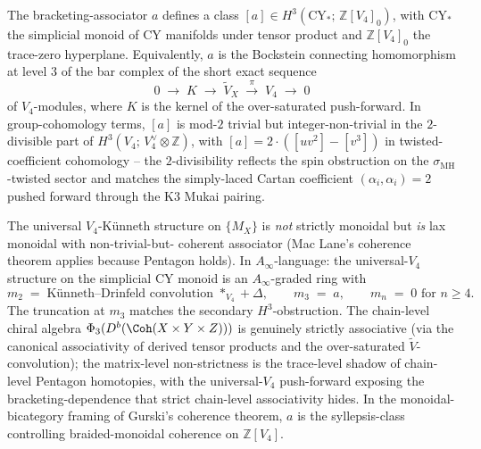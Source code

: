 \begin{remark}
\label{rem:bracketing-associator-bockstein}
The bracketing-associator $a$ defines a class
$[a] \in H^3(\mathrm{CY}_*;\, \mathbb{Z}[V_4]_0)$, with
$\mathrm{CY}_*$ the simplicial monoid of CY manifolds under
tensor product and $\mathbb{Z}[V_4]_0$ the trace-zero hyperplane.
Equivalently, $a$ is the Bockstein connecting homomorphism at
level $3$ of the bar complex of the short exact sequence
\[
 0 \;\to\; K \;\to\; \widetilde{V}_X \;\xrightarrow{\;\pi\;}\; V_4 \;\to\; 0
\]
of $V_4$-modules, where $K$ is the kernel of the over-saturated
push-forward. In group-cohomology terms, $[a]$ is mod-$2$ trivial
but integer-non-trivial in the $2$-divisible part of
$H^3(V_4;\, V_4^\vee \otimes \mathbb{Z})$, with
$[a] = 2 \cdot ([uv^2] - [v^3])$ in twisted-coefficient cohomology --
the $2$-divisibility reflects the spin obstruction on the
$\sigma_{\mathrm{MH}}$-twisted sector and matches the simply-laced
Cartan coefficient $(\alpha_i, \alpha_i) = 2$ pushed forward through
the K$3$ Mukai pairing.
\end{remark}

\begin{remark}
\label{rem:coherence-resolution}
The universal $V_4$-Künneth structure on $\{M_X\}$ is \emph{not}
strictly monoidal but \emph{is} lax monoidal with non-trivial-but-
coherent associator (Mac Lane's coherence theorem applies because
Pentagon holds). In $A_\infty$-language: the universal-$V_4$
structure on the simplicial CY monoid is an $A_\infty$-graded ring
with
\[
 m_2 \;=\; \text{Künneth--Drinfeld convolution } *_{V_4} + \Delta,
 \qquad m_3 \;=\; a, \qquad m_n \;=\; 0 \text{ for } n \geq 4.
\]
The truncation at $m_3$ matches the secondary $H^3$-obstruction.
The chain-level chiral algebra $\Phi_3(D^b(\Coh(X \times Y \times Z)))$
is genuinely strictly associative
\textup{(}via the canonical associativity of derived tensor products
and the over-saturated $\widetilde{V}$-convolution\textup{);} the
matrix-level non-strictness is the trace-level shadow of chain-level
Pentagon homotopies, with the universal-$V_4$ push-forward exposing
the bracketing-dependence that strict chain-level associativity hides.
In the monoidal-bicategory framing of Gurski's coherence theorem,
$a$ is the syllepsis-class controlling braided-monoidal coherence on
$\mathbb{Z}[V_4]$.
\end{remark}

